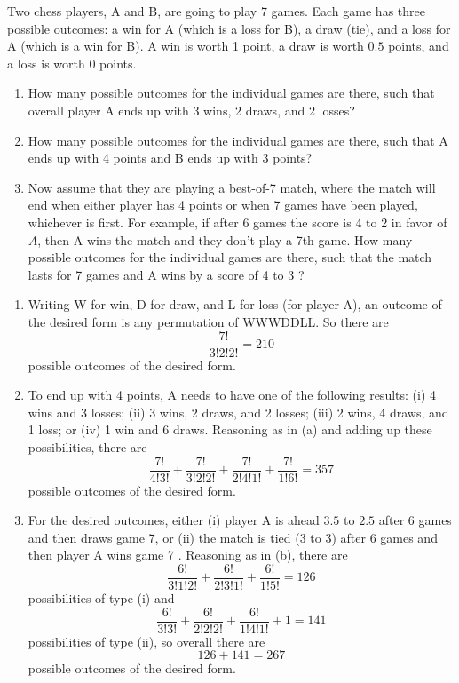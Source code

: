 
\setcounter{theorem}{5}
\begin{exercise}[BH.1.7]
Two chess players, A and B, are going to play 7 games. Each game has three possible outcomes: a win for A (which is a loss for B), a draw (tie), and a loss for A (which is a win for B). A win is worth 1 point, a draw is worth $0.5$ points, and a loss is worth 0 points.
\begin{enumerate}
	\item How many possible outcomes for the individual games are there, such that overall player A ends up with 3 wins, 2 draws, and 2 losses?
	\item How many possible outcomes for the individual games are there, such that A ends up with 4 points and B ends up with 3 points?
	\item Now assume that they are playing a best-of-7 match, where the match will end when either player has 4 points or when 7 games have been played, whichever is first. For example, if after 6 games the score is 4 to 2 in favor of $A$, then A wins the match and they don't play a 7th game. How many possible outcomes for the individual games are there, such that the match lasts for 7 games and A wins by a score of 4 to 3 ?
\end{enumerate} 
	\begin{solution}
\begin{enumerate}
	\item   Writing W for win, D for draw, and L for loss (for player A), an outcome of the desired form is any permutation of WWWDDLL. So there are
	$$
	\frac{7 !}{3 ! 2 ! 2 !}=210
	$$
	possible outcomes of the desired form.
	\item   To end up with 4 points, A needs to have one of the following results: (i) 4 wins and 3 losses; (ii) 3 wins, 2 draws, and 2 losses; (iii) 2 wins, 4 draws, and 1 loss; or (iv) 1 win and 6 draws. Reasoning as in (a) and adding up these possibilities, there are
	$$
	\frac{7 !}{4 ! 3 !}+\frac{7 !}{3 ! 2 ! 2 !}+\frac{7 !}{2 ! 4 ! 1 !}+\frac{7 !}{1 ! 6 !}=357
	$$
	possible outcomes of the desired form.
	\item   For the desired outcomes, either (i) player A is ahead $3.5$ to $2.5$ after 6 games and then draws game 7, or (ii) the match is tied (3 to 3) after 6 games and then player A wins game 7 . Reasoning as in (b), there are
	$$
	\frac{6 !}{3 ! 1 ! 2 !}+\frac{6 !}{2 ! 3 ! 1 !}+\frac{6 !}{1 ! 5 !}=126
	$$
	possibilities of type (i) and
	$$
	\frac{6 !}{3 ! 3 !}+\frac{6 !}{2 ! 2 ! 2 !}+\frac{6 !}{1 ! 4 ! 1 !}+1=141
	$$
	possibilities of type (ii), so overall there are
	$$
	126+141=267
	$$
	possible outcomes of the desired form.
\end{enumerate}
	\end{solution}
\end{exercise}


